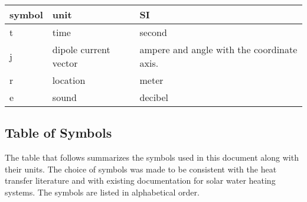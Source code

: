 \documentclass[12pt]{article}
\begin{document}
\renewcommand{\arraystretch}{1.2}
  \noindent \begin{tabular}{l l l} 
    \toprule		
    \textbf{symbol} & \textbf{unit} & \textbf{SI}\\
    \midrule 
    \si t & time & second\\
    \si j & dipole current vector & ampere and angle with the coordinate axis. \\
    \si r & location & meter\\
    \si e & sound & decibel\\
    \bottomrule
  \end{tabular}

%


\subsection{Table of Symbols}

The table that follows summarizes the symbols used in this document along with
their units.  The choice of symbols was made to be consistent with the heat
transfer literature and with existing documentation for solar water heating
systems.  The symbols are listed in alphabetical order.
\end{document}
